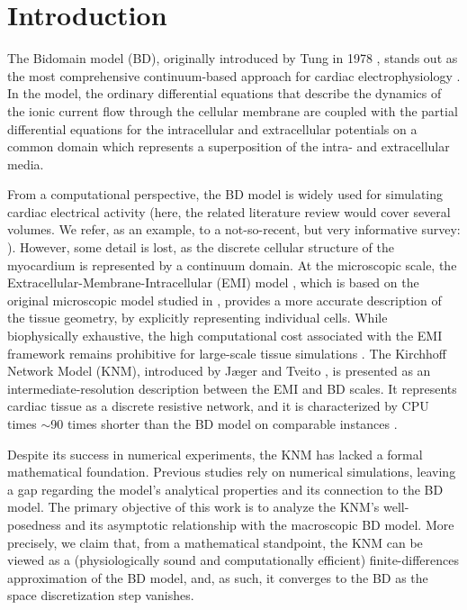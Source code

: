 \documentclass[a4paper,11pt]{article}
\theoremstyle{definition}
\numberwithin{equation}{section}
\begin{document}
\section{Introduction}
\label{sec:intro}
The Bidomain model (BD), originally introduced by Tung in 1978 \cite{LT78}, stands out as the most comprehensive continuum-based approach for cardiac electrophysiology \cite{CFPS14}. In the model, the ordinary differential equations that describe the dynamics of the ionic current flow through the cellular membrane are coupled with the partial differential equations for the intracellular and extracellular potentials on a common domain which represents a superposition of the intra- and extracellular media. %

From a computational perspective, the BD model is widely used for simulating cardiac electrical activity (here, the related literature review would cover several volumes. We refer, as an example, to a not-so-recent, but very informative survey: \cite{CFPS14}). However, some detail is lost, as the discrete cellular structure of the myocardium is represented by a continuum domain. At the microscopic scale, the Extracellular-Membrane-Intracellular (EMI) model \cite{JaegerTveito_EMI}, which is based on the original microscopic model studied in \cite{CFS02}, provides a more accurate description of the tissue geometry, by explicitly representing individual cells. While biophysically exhaustive, the high computational cost associated with the EMI framework remains prohibitive for large-scale tissue simulations \cite{JaegerTveito_EMI, JT23}. The Kirchhoff Network Model (KNM), introduced by J\ae ger and Tveito \cite{JaegerTveito_KNM, JaegerTveito_SKNM}, is presented as an intermediate-resolution description between the EMI and BD scales. It represents cardiac tissue as a discrete resistive network, and it is characterized by CPU times $\sim$90 times shorter than the BD model on comparable instances \cite{JaegerTveito_KNM}.

Despite its success in numerical experiments, the KNM has lacked a formal mathematical foundation. Previous studies \cite{JaegerTveito_KNM, JT23} rely on numerical simulations, leaving a gap regarding the model's analytical properties and its connection to the BD model. The primary objective of this work is to analyze the KNM's well-posedness and its asymptotic relationship with the macroscopic BD model. More precisely, we claim that, from a mathematical standpoint, the KNM can be viewed as a (physiologically sound and computationally efficient) finite-differences approximation of the BD model, and, as such, it converges to the BD as the space discretization step vanishes.
\end{document}

